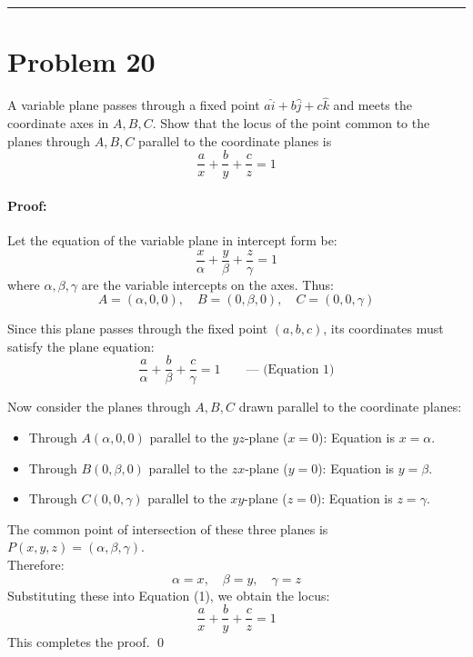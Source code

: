 \documentclass[11pt,a4paper]{article}
\begin{document}
\vspace{0.4cm}
\hrule
\vspace{0.4cm}

\section{Problem 20}
\begin{problembox}[Problem 20]
A variable plane passes through a fixed point $a\hat{i} + b\hat{j} + c\hat{k}$ and meets the coordinate axes in $A, B, C$. Show that the locus of the point common to the planes through $A, B, C$ parallel to the coordinate planes is
$$\frac{a}{x} + \frac{b}{y} + \frac{c}{z} = 1$$
\end{problembox}

\paragraph{Proof:}
Let the equation of the variable plane in intercept form be:
$$\frac{x}{\alpha} + \frac{y}{\beta} + \frac{z}{\gamma} = 1$$
where $\alpha, \beta, \gamma$ are the variable intercepts on the axes. Thus:
$$A = (\alpha, 0, 0), \quad B = (0, \beta, 0), \quad C = (0, 0, \gamma)$$

Since this plane passes through the fixed point $(a, b, c)$, its coordinates must satisfy the plane equation:
$$\frac{a}{\alpha} + \frac{b}{\beta} + \frac{c}{\gamma} = 1 \qquad \text{--- (Equation 1)}$$

Now consider the planes through $A, B, C$ drawn parallel to the coordinate planes:
\begin{itemize}
    \item Through $A(\alpha, 0, 0)$ parallel to the $yz$-plane ($x=0$): Equation is $x = \alpha$.
    \item Through $B(0, \beta, 0)$ parallel to the $zx$-plane ($y=0$): Equation is $y = \beta$.
    \item Through $C(0, 0, \gamma)$ parallel to the $xy$-plane ($z=0$): Equation is $z = \gamma$.
\end{itemize}
The common point of intersection of these three planes is $P(x, y, z) = (\alpha, \beta, \gamma)$.\\
Therefore:
$$\alpha = x, \quad \beta = y, \quad \gamma = z$$
Substituting these into Equation (1), we obtain the locus:
$$\frac{a}{x} + \frac{b}{y} + \frac{c}{z} = 1$$
This completes the proof. \qed
\end{document}
